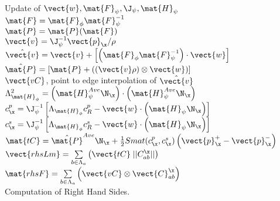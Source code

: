 \begin{algorithm}[H]
	Update of $\vect{w}, \mat{F}_{\psi}, \J_{\psi}, \mat{H}_{\psi}$ \\
	$\mat{F} = \mat{F}_{\phi}\mat{F}_{\psi}^{-1}$ \\
	$\mat{P} = \mat{P}(\mat{F})$ \\
	$\vect{v} = \J_{\psi}^{-1} \vect{p}_{\x}/\rho$ \\
	$\hat{\vect{v}} = \vect{v} + \left[ \left( \mat{F}_{\phi}\mat{F}_{\psi}^{-1}\right)\cdot\vect{w} \right]$ \\
	$\hat{\mat{P}} = \left[ \mat{P} + \left( (\vect{v}\rho)\otimes \vect{w}   \right) \right]$ \\
	$\vect{vC}$, point to edge interpolation of $\hat{\vect{v}}$ \\
	$\Lambda_{\mat{H}_\phi}^2 = \left( \mat{H}_{\psi}^{Ave} \N_{\x} \right) \cdot \left( \mat{H}_{\psi}^{Ave} \N_{\x} \right)$ \\
	$c^{p}_{\x} = \J_{\psi}^{-1} \left[ \Lambda_{\mat{H}_\phi}c^{p}_{R} - \vect{w}\cdot\left( \mat{H}_{\psi}\N_{\x} \right) \right]$ \\
	$c^{s}_{\x} = \J_{\psi}^{-1} \left[ \Lambda_{\mat{H}_\phi}c^{s}_{R} - \vect{w}\cdot\left( \mat{H}_{\psi}\N_{\x} \right) \right]$  \\
	$\mat{tC} = \hat{\mat{P}}^{Ave} \N_{\x} + \frac{1}{2} Smat(c^{p}_{\x},c^{s}_{\x}) \left( \vect{p}_{\x}^{+}-\vect{p}_{\x}^{-}\right)$ \\
	$\vect{rhsLm} =  \sum\limits_{b\in\Lambda_a} \left( \vect{tC} \; ||C^{\x}_{ab}|| \right)$ \\
	$\mat{rhsF} =  \sum\limits_{b\in\Lambda_a} \left( \vect{vC} \otimes \vect{C}^{\x}_{ab} \right)$ \\
	\caption{Computation of Right Hand Sides.}
\end{algorithm}

